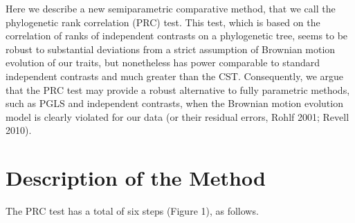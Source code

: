 \documentclass[fleqn,10pt,lineno]{wlpeerj} %
\begin{document}
Here we describe a new semiparametric comparative method, that we call the phylogenetic rank correlation (PRC) test. This test, which is based on the correlation of ranks of independent contrasts on a phylogenetic tree, seems to be robust to substantial deviations from a strict assumption of Brownian motion evolution of our traits, but nonetheless has power comparable to standard independent contrasts and much greater than the CST. Consequently, we argue that the PRC test may provide a robust alternative to fully parametric methods, such as PGLS and independent contrasts, when the Brownian motion evolution model is clearly violated for our data (or their residual errors, Rohlf 2001; Revell 2010).

\section{Description of the Method}\label{description-of-the-method}

The PRC test has a total of six steps (Figure 1), as follows.
\end{document}
